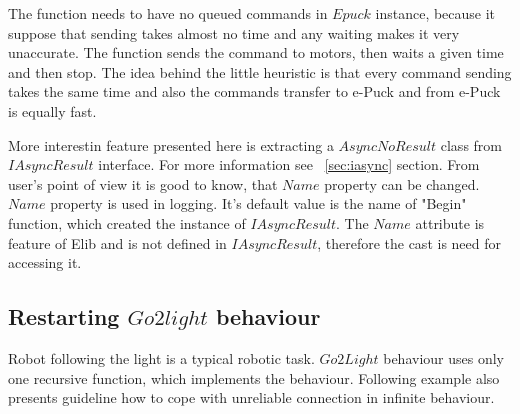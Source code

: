 	The function needs to have no queued commands in $Epuck$ instance, because it suppose that sending takes almost no time and any waiting makes it very unaccurate.
	The function sends the command to motors, then waits a given time and then stop.
	The idea behind the little heuristic is that every command sending takes the same time and also the commands transfer to e-Puck and from e-Puck is equally fast.

	More interestin feature presented here is extracting a $AsyncNoResult$ class from $IAsyncResult$ interface. For more information see ~\ref{sec:iasync} section.
	From user's point of view it is good to know, that $Name$ property can be changed. $Name$ property is used in logging. It's default value is the name of "Begin" function,
	which created the instance of $IAsyncResult$. The $Name$ attribute is feature of Elib and is not defined in $IAsyncResult$, therefore the cast is need for accessing it.

\subsection{Restarting $Go2light$ behaviour}\label{sec:go2light}
	Robot following the light is a typical robotic task. $Go2Light$ behaviour uses only one recursive function, which implements the behaviour.
	Following example also presents guideline how to cope with unreliable connection in infinite behaviour.

